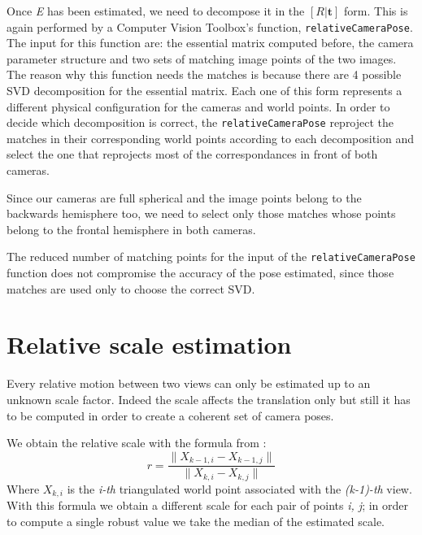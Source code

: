 Once \textit{E} has been estimated, we need to decompose it in the 
\( [R|\mathbf{t} ] \) form. This is again performed by a Computer Vision 
Toolbox's function, {\tt relativeCameraPose}.
The input for this function are: the essential matrix computed before, the 
camera parameter structure and two sets of matching image points of the two 
images.
The reason why this function needs the matches is because there are 4 possible 
SVD decomposition for the essential matrix. Each one of this form represents a 
different physical configuration for the cameras and world points.
In order to decide which decomposition is correct, the {\tt relativeCameraPose}
reproject the matches in their corresponding world points according to each 
decomposition and select the one that reprojects most of the correspondances in 
front of both cameras.

Since our cameras are full spherical and the image points belong to the 
backwards hemisphere too, we need to select only those matches whose points 
belong to the frontal hemisphere in both cameras.

The reduced number of matching points for the input of the 
{\tt relativeCameraPose} function does not compromise the accuracy of the pose 
estimated, since those matches are used only to choose the 
correct SVD.

\section{Relative scale estimation}
Every relative motion between two views can only be estimated up to an unknown 
scale factor. Indeed the scale affects the translation only but still it has to 
be computed in order to create a coherent set of camera poses.

We obtain the relative scale with the formula from 
\cite{scaramuzzaVisualOdometryI}:
\begin{equation}
	r = \frac{\| X_{k-1, i} - X_{k - 1, j} \|}{\| X_{k, i} - X_{k, j} \|}
\end{equation}
Where \( X_{k, i} \) is the \textit{i-th} triangulated world point associated 
with the \textit{(k-1)-th} view. With this formula we obtain a different scale 
for each pair of points \textit{i, j}; in order to compute a single robust value
we take the median of the estimated scale.

